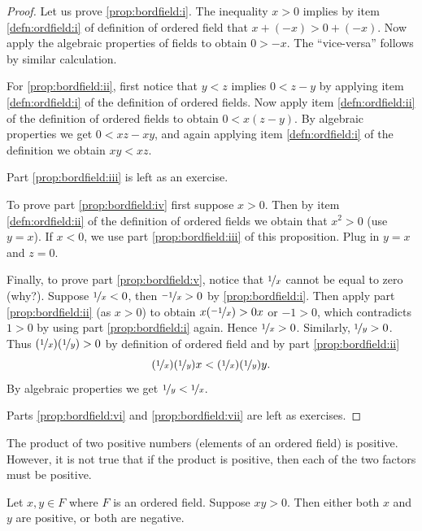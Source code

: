 \begin{proof}
Let us prove \ref{prop:bordfield:i}.  The inequality $x > 0$ implies by item
\ref{defn:ordfield:i} of definition of ordered field that
$x + (-x) > 0 + (-x)$.  Now apply the algebraic properties of fields to
obtain $0 > -x$.  The ``vice-versa'' follows by similar calculation.

For \ref{prop:bordfield:ii}, first notice that $y < z$ implies
$0 < z - y$ by applying 
item \ref{defn:ordfield:i} of the definition of ordered fields.  
Now apply item 
\ref{defn:ordfield:ii} of the definition of ordered fields to obtain
$0 < x(z-y)$.  By algebraic properties we get $0 < xz - xy$,
and again applying item
\ref{defn:ordfield:i} of the definition we obtain $xy < xz$.

Part \ref{prop:bordfield:iii} is left as an exercise.

To prove part \ref{prop:bordfield:iv} first suppose $x > 0$.  Then
by item 
\ref{defn:ordfield:ii} of the definition of ordered fields we obtain
that $x^2 > 0$ (use $y=x$).  If $x < 0$, we use 
part \ref{prop:bordfield:iii} of this proposition.  Plug in $y=x$ and
$z=0$.

Finally, to prove part \ref{prop:bordfield:v}, notice that
$\nicefrac{1}{x}$ cannot be equal to zero (why?).
Suppose $\nicefrac{1}{x} < 0$,
then $\nicefrac{-1}{x} > 0$ by \ref{prop:bordfield:i}.  Then apply
part \ref{prop:bordfield:ii} (as $x > 0$) to obtain
$x(\nicefrac{-1}{x}) > 0x$ or $-1 > 0$, which contradicts $1 > 0$ by using part
\ref{prop:bordfield:i} again.  Hence $\nicefrac{1}{x} > 0$.
Similarly, $\nicefrac{1}{y} > 0$.  Thus $(\nicefrac{1}{x})(\nicefrac{1}{y}) > 0$
by definition of ordered field and by part \ref{prop:bordfield:ii}
\begin{equation*}
(\nicefrac{1}{x})(\nicefrac{1}{y})x < (\nicefrac{1}{x})(\nicefrac{1}{y})y .
\end{equation*}
By algebraic properties we get $\nicefrac{1}{y} < \nicefrac{1}{x}$.

Parts \ref{prop:bordfield:vi} and \ref{prop:bordfield:vii} are left as
exercises.
\end{proof}

The product of two positive numbers (elements of an ordered field) is positive.
However, it is not true that if the product is positive, then each of the two
factors must be positive.

\begin{prop}
Let $x,y \in F$ where $F$ is an ordered field.  Suppose 
$xy > 0$.  Then either both $x$ and $y$ are positive, or both are negative.
\end{prop}


